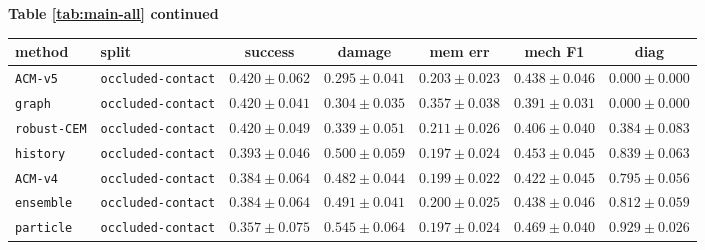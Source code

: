 \documentclass{article}
\begin{document}
\begin{center}
\textbf{Table \ref{tab:main-all} continued}\\[0.4ex]
\begin{tabular}{llccccc}
\toprule
method & split & success & damage & mem err & mech F1 & diag \\
\midrule
\texttt{ACM-v5} & \texttt{occluded-contact} & $0.420 \pm 0.062$ & $0.295 \pm 0.041$ & $0.203 \pm 0.023$ & $0.438 \pm 0.046$ & $0.000 \pm 0.000$ \\
\texttt{graph} & \texttt{occluded-contact} & $0.420 \pm 0.041$ & $0.304 \pm 0.035$ & $0.357 \pm 0.038$ & $0.391 \pm 0.031$ & $0.000 \pm 0.000$ \\
\texttt{robust-CEM} & \texttt{occluded-contact} & $0.420 \pm 0.049$ & $0.339 \pm 0.051$ & $0.211 \pm 0.026$ & $0.406 \pm 0.040$ & $0.384 \pm 0.083$ \\
\texttt{history} & \texttt{occluded-contact} & $0.393 \pm 0.046$ & $0.500 \pm 0.059$ & $0.197 \pm 0.024$ & $0.453 \pm 0.045$ & $0.839 \pm 0.063$ \\
\texttt{ACM-v4} & \texttt{occluded-contact} & $0.384 \pm 0.064$ & $0.482 \pm 0.044$ & $0.199 \pm 0.022$ & $0.422 \pm 0.045$ & $0.795 \pm 0.056$ \\
\texttt{ensemble} & \texttt{occluded-contact} & $0.384 \pm 0.064$ & $0.491 \pm 0.041$ & $0.200 \pm 0.025$ & $0.438 \pm 0.046$ & $0.812 \pm 0.059$ \\
\texttt{particle} & \texttt{occluded-contact} & $0.357 \pm 0.075$ & $0.545 \pm 0.064$ & $0.197 \pm 0.024$ & $0.469 \pm 0.040$ & $0.929 \pm 0.026$ \\
\bottomrule
\end{tabular}
\end{center}
\normalsize
\end{document}
